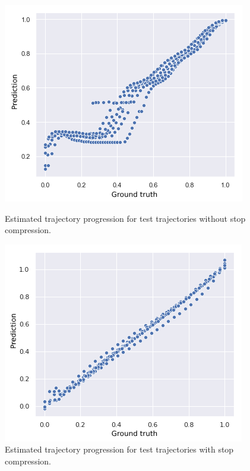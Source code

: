 \begin{figure}[H]
  \begin{minipage}{.46\textwidth}
    \includegraphics[scale=0.48,width=\textwidth]{figures/traj-without-stop-compression3.png}
    \caption{Estimated trajectory progression for test trajectories without stop compression.}
    \label{fig:progression-without-stop-compression}
  \end{minipage}
  \hspace{5pt}
  \begin{minipage}{.46\textwidth}
    \includegraphics[scale=0.5,width=\textwidth]{figures/traj-with-stop-compression3.png}
    \caption{Estimated trajectory progression for test trajectories with stop compression.}
    \label{fig:progression-with-stop-compression}
  \end{minipage}
\end{figure}


